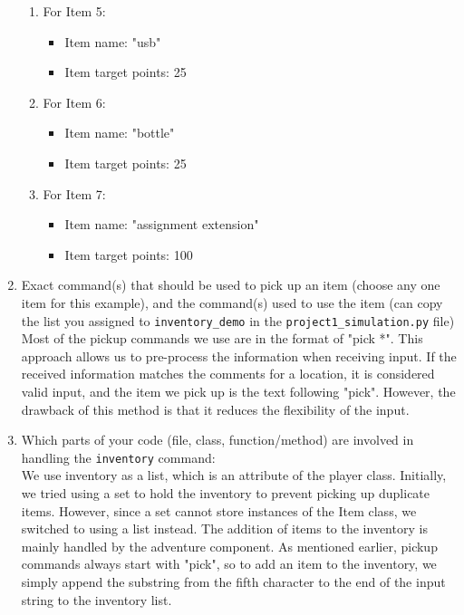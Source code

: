 \documentclass[11pt]{article}
\begin{document}
\begin{enumerate}
\begin{enumerate}
            \item For Item 5:
    \begin{itemize}
    \item Item name: "usb"
    \item Item target points: 25
    \end{itemize}
            \item For Item 6:
    \begin{itemize}
    \item Item name: "bottle"
    \item Item target points: 25
    \end{itemize}
            \item For Item 7:
    \begin{itemize}
    \item Item name: "assignment extension"
    \item Item target points: 100
    \end{itemize}
\end{enumerate}

    \item Exact command(s) that should be used to pick up an item (choose any one item for this example), and the command(s) used to use the item (can copy the list you assigned to \texttt{inventory\_demo} in the \texttt{project1\_simulation.py} file)\\
    Most of the pickup commands we use are in the format of "pick *". This approach allows us to pre-process the information when receiving input. If the received information matches the comments for a location, it is considered valid input, and the item we pick up is the text following "pick". However, the drawback of this method is that it reduces the flexibility of the input.\\
    \item Which parts of your code (file, class, function/method) are involved in handling the \texttt{inventory} command:\\
    We use inventory as a list, which is an attribute of the player class. Initially, we tried using a set to hold the inventory to prevent picking up duplicate items. However, since a set cannot store instances of the Item class, we switched to using a list instead. The addition of items to the inventory is mainly handled by the adventure component. As mentioned earlier, pickup commands always start with "pick", so to add an item to the inventory, we simply append the substring from the fifth character to the end of the input string to the inventory list.
\end{enumerate}
\end{document}
